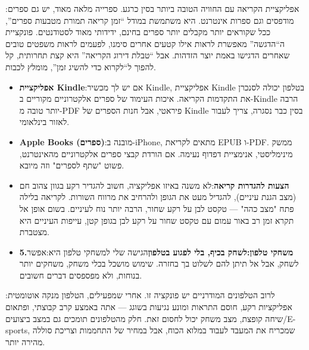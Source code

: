
:אפליקציית הקריאה עם החוויה הטובה ביותר בסין כרגע. ספרייה מלאה מאוד, יש גם ספרים מודפסים וגם ספרות אינטרנט. היא משתמשת במודל “זמן קריאה תמורת מטבעות ספרים”, ככל שקוראים יותר מקבלים יותר ספרים בחינם, ידידותי מאוד לסטודנטים. פונקציית ה“הדגשה” מאפשרת לראות אילו קטעים אחרים סימנו, לפעמים לראות משפטים טובים שאחרים הדגישו באמת יוצר הזדהות. אבל “טבלת דירוג הקריאה” היא קצת תחרותית, קל להפוך ל“לקרוא כדי להשיג זמן”, מומלץ לכבות.

\begin{itemize}
  \item \textbf{אפליקציית Kindle}:אם יש לך מכשיר Kindle, אפליקציית Kindle בטלפון יכולה לסנכרן את התקדמות הקריאה. איכות העימוד של ספרים אלקטרוניים מקוריים ב-Kindle הרבה יותר טובה מ-PDF פיראטי, אבל חנות הספרים של Kindle בסין כבר נסגרה, צריך לעבור לאזור בינלאומי.
  \item \textbf{Apple Books (ספרים)}:מובנה ב-iPhone, מתאים לקריאת EPUB ו-PDF. ממשק מינימליסטי, אנימציית דפדוף נעימה. אם הורדת קבצי ספרים אלקטרוניים מהאינטרנט, פשוט "שתף לספרים" וזה מיובא.
  \item \textbf{הצעות להגדרות קריאה}:לא משנה באיזו אפליקציה, חשוב להגדיר רקע בגוון צהוב חם (מצב הגנת עיניים), להגדיל מעט את הגופן ולהרחיב את מרווח השורות. לקריאה בלילה פתח "מצב כהה" — טקסט לבן על רקע שחור, הרבה יותר נוח לעיניים. בשום אופן אל תקרא זמן רב באור עמום עם טקסט שחור על רקע לבן בגופן קטן, עייפות העיניים היא מצטברת.
  \item \textbf{5.משחקי טלפון:לשחק בכיף, בלי לפגוע בטלפון}הגישה שלי למשחקי טלפון היא:אפשר לשחק, אבל אל תיתן להם לשלוט בך בחזרה. שימוש מושכל בכלי משחק, משחקים יותר בנוחות, ולא מפספסים דברים חשובים.
\end{itemize}


:לרוב הטלפונים המודרניים יש פונקציה זו. אחרי שמפעילים, הטלפון מנקה אוטומטית אפליקציות רקע, חוסם התראות ומונע נגיעות בשוגג — אתה באמצע קרב קבוצתי, ופתאום שיחה קופצת, מצב משחק יכול לחסום זאת. חלק מהטלפונים תומכים גם במצב ביצועים/E-sports, שמכריח את המעבד לעבוד במלוא הכוח, אבל במחיר של התחממות וצריכת סוללה מהירה יותר.

